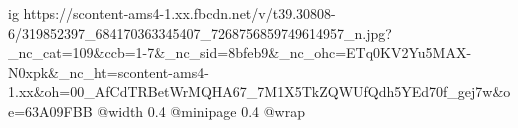  
 
 
 
 

\ifcmt
  ig https://scontent-ams4-1.xx.fbcdn.net/v/t39.30808-6/319852397_684170363345407_7268756859749614957_n.jpg?_nc_cat=109&ccb=1-7&_nc_sid=8bfeb9&_nc_ohc=ETq0KV2Yu5MAX-N0xpk&_nc_ht=scontent-ams4-1.xx&oh=00_AfCdTRBetWrMQHA67_7M1X5TkZQWUfQdh5YEd70f_gej7w&oe=63A09FBB
  @width 0.4
  @minipage 0.4
  @wrap \parpic[r]
\fi
